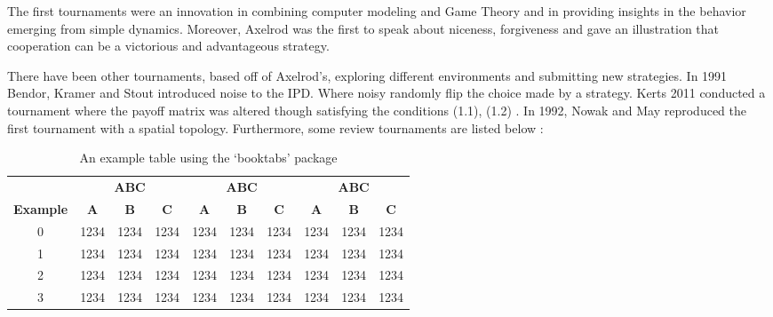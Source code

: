 The first tournaments were an innovation in combining computer modeling and Game
Theory and in providing insights in the behavior emerging from simple dynamics.
Moreover, Axelrod was the first to speak about niceness, forgiveness and gave an
illustration that cooperation can be a victorious and advantageous strategy.

There have been other tournaments, based off of Axelrod’s, exploring different
environments and submitting new strategies. In 1991 Bendor, Kramer and Stout
introduced noise to the IPD. Where noisy randomly flip the choice made by a strategy.
Kerts 2011 conducted a tournament where the payoff matrix was altered though
satisfying the conditions (1.1), (1.2) . In 1992, Nowak and May reproduced the first
tournament with a spatial topology. Furthermore, some review tournaments are
listed below :


\begin{table}[h]
\centering
\caption{An example table using the `booktabs' package}
\label{fig:exampletable}
\begin{tabular}{cccccccccc}
\toprule
& \multicolumn{3}{c}{\textbf{ABC}} & \multicolumn{3}{c}{\textbf{ABC}} & \multicolumn{3}{c}{\textbf{ABC}} \\
\cmidrule(lr){2-4}\cmidrule(lr){5-7}\cmidrule(lr){8-10}
\textbf{Example}      & \textbf{A}       & \textbf{B}       & \textbf{C}      & \textbf{A}           & \textbf{B}           & \textbf{C}          & \textbf{A}           & \textbf{B}           & \textbf{C}          \\
\cmidrule(lr){1-1}\cmidrule(lr){2-4}\cmidrule(lr){5-7}\cmidrule(lr){8-10}
0         & 1234      & 1234     & 1234     & 1234          & 1234         & 1234         & 1234        & 1234         & 1234         \\
1         & 1234      & 1234     & 1234     & 1234          & 1234         & 1234         & 1234        & 1234         & 1234         \\
2         & 1234      & 1234     & 1234     & 1234          & 1234         & 1234         & 1234        & 1234         & 1234        \\
3         & 1234      & 1234     & 1234     & 1234          & 1234         & 1234         & 1234        & 1234         & 1234         \\ \bottomrule
\end{tabular}
\end{table}

